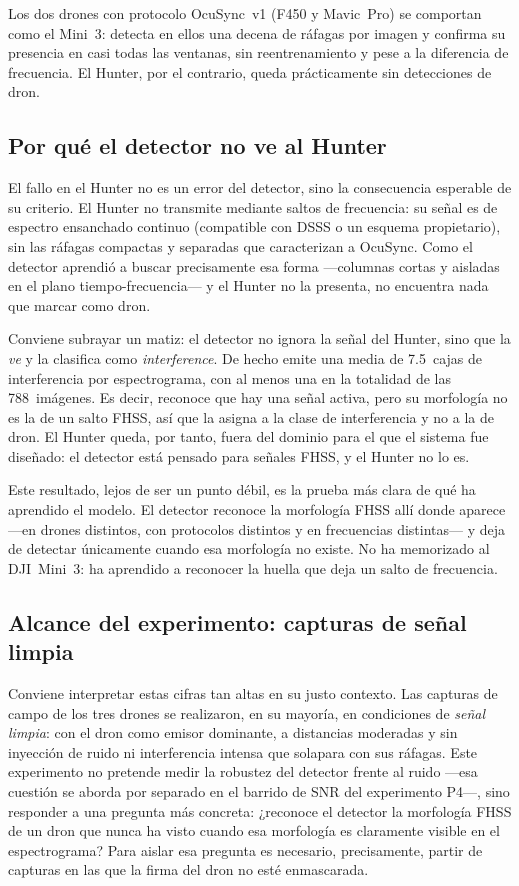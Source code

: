 Los dos drones con protocolo OcuSync~v1 (F450 y Mavic~Pro) se comportan como el Mini~3: detecta en ellos una decena de ráfagas por imagen y confirma su presencia en casi todas las ventanas, sin reentrenamiento y pese a la diferencia de frecuencia. El Hunter, por el contrario, queda prácticamente sin detecciones de dron.

\FloatBarrier
\subsection{Por qué el detector no ve al Hunter}
\label{sec:zeroshot_hunter}

El fallo en el Hunter no es un error del detector, sino la consecuencia esperable de su criterio. El Hunter no transmite mediante saltos de frecuencia: su señal es de espectro ensanchado continuo (compatible con DSSS o un esquema propietario), sin las ráfagas compactas y separadas que caracterizan a OcuSync. Como el detector aprendió a buscar precisamente esa forma ---columnas cortas y aisladas en el plano tiempo-frecuencia--- y el Hunter no la presenta, no encuentra nada que marcar como dron.

Conviene subrayar un matiz: el detector no ignora la señal del Hunter, sino que la \emph{ve} y la clasifica como \emph{interference}. De hecho emite una media de \num{7,5}~cajas de interferencia por espectrograma, con al menos una en la totalidad de las \num{788}~imágenes. Es decir, reconoce que hay una señal activa, pero su morfología no es la de un salto FHSS, así que la asigna a la clase de interferencia y no a la de dron. El Hunter queda, por tanto, fuera del dominio para el que el sistema fue diseñado: el detector está pensado para señales FHSS, y el Hunter no lo es.

Este resultado, lejos de ser un punto débil, es la prueba más clara de qué ha aprendido el modelo. El detector reconoce la morfología FHSS allí donde aparece ---en drones distintos, con protocolos distintos y en frecuencias distintas--- y deja de detectar únicamente cuando esa morfología no existe. No ha memorizado al DJI~Mini~3: ha aprendido a reconocer la huella que deja un salto de frecuencia.

\subsection{Alcance del experimento: capturas de señal limpia}
\label{sec:zeroshot_alcance}

Conviene interpretar estas cifras tan altas en su justo contexto. Las capturas de campo de los tres drones se realizaron, en su mayoría, en condiciones de \emph{señal limpia}: con el dron como emisor dominante, a distancias moderadas y sin inyección de ruido ni interferencia intensa que solapara con sus ráfagas. Este experimento no pretende medir la robustez del detector frente al ruido ---esa cuestión se aborda por separado en el barrido de SNR del experimento P4---, sino responder a una pregunta más concreta: ¿reconoce el detector la morfología FHSS de un dron que nunca ha visto cuando esa morfología es claramente visible en el espectrograma? Para aislar esa pregunta es necesario, precisamente, partir de capturas en las que la firma del dron no esté enmascarada.

